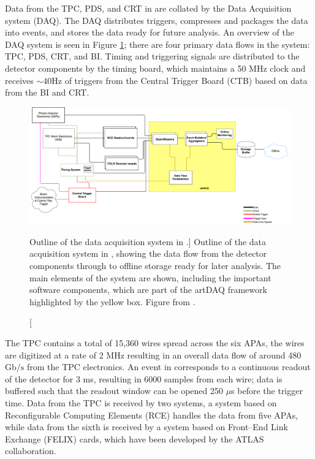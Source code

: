 Data from the TPC, PDS, and CRT in \protodune{} are collated by the Data 
Acquisition system (DAQ). The DAQ distributes triggers, compresses and packages 
the data into events, and stores the data ready for future analysis. 
An overview of the \protodune{} DAQ system is seen in Figure 
\ref{fig:pdsp_daq}; there are four primary data flows in the system: TPC, PDS, 
CRT, and BI. Timing and triggering signals are distributed to the detector 
components by the timing board, which maintains a 50 MHz clock and receives 
$\sim 40 \mbox{Hz}$ of triggers from the Central Trigger Board (CTB) based on 
data from the BI and CRT\cite{Abi:2017aow}.

\begin{figure}

	\centering

	\includegraphics[width=\textwidth]{figures/pdsp_daq.pdf}

	\caption
	[Outline of the data acquisition system in \protodune{}.]
	{Outline of the data acquisition system in \protodune{}, showing the data flow
	from the detector components through to offline storage ready for later
	analysis. The main elements of the system are shown, including the important 
	software components, which are part of the artDAQ framework highlighted by 
	the yellow box. Figure from \cite{Abi:2017aow}.}

	\label{fig:pdsp_daq}

\end{figure}

The \protodune{} TPC contains a total of 15,360 wires spread across the six
APAs, the wires are digitized at a rate of 2 MHz resulting in an overall data
flow of around 480 $\mbox{Gb/s}$ from the TPC electronics. An event in
\protodune{} corresponds to a continuous readout of the detector for 3 ms,
resulting in 6000 samples from each wire; data is buffered such that the readout
window can be opened 250 $\mu$s before the trigger time. Data from the TPC is
received by two systems, a system based on Reconfigurable Computing Elements
(RCE)\cite{7431254} handles the data from five APAs, while data from the sixth 
is received by a system based on Front--End Link Exchange (FELIX) cards, which 
have been developed by the ATLAS collaboration\cite{Anderson_2016}.

